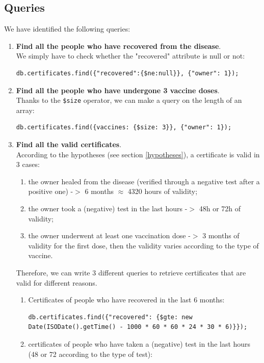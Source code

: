 \documentclass{article}
\begin{document}
\subsection{Queries}
We have identified the following queries:
\begin{enumerate}
\item \textbf{Find all the people who have recovered from the disease}.\\
We simply have to check whether the "recovered" attribute is null or not:
\begin{lstlisting}
db.certificates.find({"recovered":{$ne:null}}, {"owner": 1});
    \end{lstlisting}
    \item \textbf{Find all the people who have undergone 3 vaccine doses}.\\
    Thanks to the \verb|$size| operator, we can make a query on the length of an array:
    \begin{lstlisting}
db.certificates.find({vaccines: {$size: 3}}, {"owner": 1});
    \end{lstlisting}
    \item \textbf{Find all the valid certificates}.\\
    According to the hypotheses (see section \ref{hypotheses}), a certificate is valid in 3 cases:
    \begin{enumerate}
            \item the owner healed from the disease (verified through a negative test after a positive one) -$>$ 6 months $\approx$ 4320 hours of validity;
        \item the owner took a (negative) test in the last hours -$>$ 48h or 72h of validity;
        \item the owner underwent at least one vaccination dose -$>$ 3 months of validity for the first dose, then the validity varies according to the type of vaccine.
    \end{enumerate}
    Therefore, we can write 3 different queries to retrieve certificates that are valid for different reasons.\\
    \begin{enumerate}
        \item Certificates of people who have recovered in the last 6 months:
    \begin{lstlisting}
db.certificates.find({"recovered": {$gte: new Date(ISODate().getTime() - 1000 * 60 * 60 * 24 * 30 * 6)}});
    \end{lstlisting}
    \item certificates of people who have taken a (negative) test in the last hours (48 or 72 according to the type of test):

\end{enumerate}
\end{enumerate}
\end{document}
